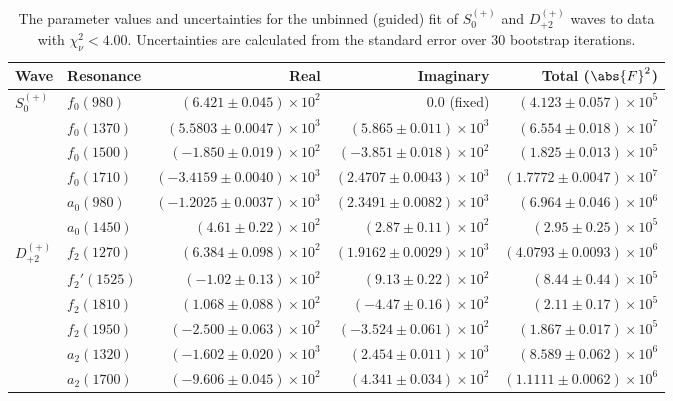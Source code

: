 \begin{table}[h]
    \begin{center}
        \begin{tabular}{llrrr}\toprule
        Wave & Resonance & Real & Imaginary & Total ($\abs{F}^2$) \\\midrule
$S_{0}^{(+)}$ & $f_{0}(980)$ & $(6.421 \pm 0.045) \times 10^{2}$ & $0.0$ (fixed) & $(4.123 \pm 0.057) \times 10^{5}$ \\
 & $f_{0}(1370)$ & $(5.5803 \pm 0.0047) \times 10^{3}$ & $(5.865 \pm 0.011) \times 10^{3}$ & $(6.554 \pm 0.018) \times 10^{7}$ \\
 & $f_{0}(1500)$ & $(-1.850 \pm 0.019) \times 10^{2}$ & $(-3.851 \pm 0.018) \times 10^{2}$ & $(1.825 \pm 0.013) \times 10^{5}$ \\
 & $f_{0}(1710)$ & $(-3.4159 \pm 0.0040) \times 10^{3}$ & $(2.4707 \pm 0.0043) \times 10^{3}$ & $(1.7772 \pm 0.0047) \times 10^{7}$ \\
 & $a_{0}(980)$ & $(-1.2025 \pm 0.0037) \times 10^{3}$ & $(2.3491 \pm 0.0082) \times 10^{3}$ & $(6.964 \pm 0.046) \times 10^{6}$ \\
 & $a_{0}(1450)$ & $(4.61 \pm 0.22) \times 10^{2}$ & $(2.87 \pm 0.11) \times 10^{2}$ & $(2.95 \pm 0.25) \times 10^{5}$ \\
$D_{+2}^{(+)}$ & $f_{2}(1270)$ & $(6.384 \pm 0.098) \times 10^{2}$ & $(1.9162 \pm 0.0029) \times 10^{3}$ & $(4.0793 \pm 0.0093) \times 10^{6}$ \\
 & $f_{2}'(1525)$ & $(-1.02 \pm 0.13) \times 10^{2}$ & $(9.13 \pm 0.22) \times 10^{2}$ & $(8.44 \pm 0.44) \times 10^{5}$ \\
 & $f_{2}(1810)$ & $(1.068 \pm 0.088) \times 10^{2}$ & $(-4.47 \pm 0.16) \times 10^{2}$ & $(2.11 \pm 0.17) \times 10^{5}$ \\
 & $f_{2}(1950)$ & $(-2.500 \pm 0.063) \times 10^{2}$ & $(-3.524 \pm 0.061) \times 10^{2}$ & $(1.867 \pm 0.017) \times 10^{5}$ \\
 & $a_{2}(1320)$ & $(-1.602 \pm 0.020) \times 10^{3}$ & $(2.454 \pm 0.011) \times 10^{3}$ & $(8.589 \pm 0.062) \times 10^{6}$ \\
 & $a_{2}(1700)$ & $(-9.606 \pm 0.045) \times 10^{2}$ & $(4.341 \pm 0.034) \times 10^{2}$ & $(1.1111 \pm 0.0062) \times 10^{6}$ \\\bottomrule
        \end{tabular}
    \caption{The parameter values and uncertainties for the unbinned (guided) fit of $S_{0}^{(+)}$ and $D_{+2}^{(+)}$ waves to data with $\chi^2_\nu < 4.00$. Uncertainties are calculated from the standard error over $30$ bootstrap iterations.}\label{tab:unbinned-fit-chisqdof-4.0-guided-Sp0p-Dp2p}
    \end{center}
\end{table}
